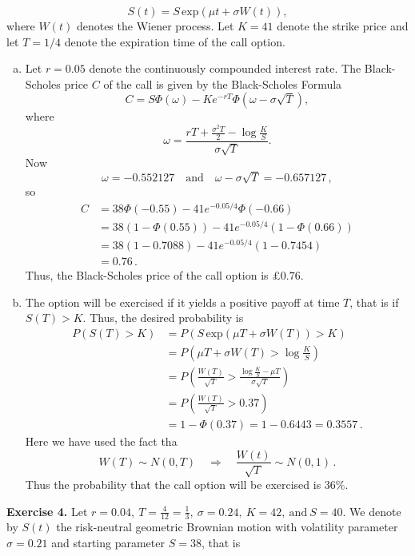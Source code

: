 \documentclass[11pt,a4paper]{article}
\begin{document}
    $$
    S(t) = S\, \text{exp}(\mu t +\sigma W(t)),
    $$
    where $W(t)$ denotes the Wiener process. Let $K = 41$ denote the strike price and let $T = 1/4$ denote the expiration time of the call option.
    \begin{enumerate}[(a)]
        \item Let $r = 0.05$ denote the continuously compounded interest rate. The Black-Scholes price $C$ of the call is given by the Black-Scholes Formula
        $$
        C = S \Phi (\omega)-Ke^{-rT}\Phi(\omega - \sigma \sqrt{T}),
        $$
        where
        $$
        \omega = \frac{rT+\frac{\sigma^2T}{2}-\log \frac{K}{S}}{\sigma\sqrt{T}}.
        $$
        Now
        $$
        \omega = −0.552127\quad \text{and}\quad \omega − \sigma \sqrt{T} = −0.657127\, ,
        $$
        so
        \begin{align*}
            C
            &= 38\Phi(-0.55)-41e^{-0.05/4}\Phi(-0.66)\\
            &= 38(1-\Phi(0.55))-41e^{-0.05/4}(1-\Phi (0.66))\\
            &= 38(1-0.7088)-41e^{-0.05/4}(1-0.7454)\\
            &= 0.76\, .
        \end{align*}
        Thus, the Black-Scholes price of the call option is $\pounds 0.76$.
        \item The option will be exercised if it yields a positive payoff at time $T$, that is if $S(T) > K$. Thus, the desired probability is
        \begin{align*}
            P(S(T) > K)
            &= P(S\, \text{exp}(\mu T + \sigma W(T)) > K)\\
            &= P\left(\mu T + \sigma W(T)> \log\frac{K}{S}\right)\\
            &= P\left(\frac{W(T)}{\sqrt{T}}>\frac{\log\frac{K}{S}-\mu T}{\sigma \sqrt{T}}\right)\\
            &= P\left(\frac{W(T)}{\sqrt{T}}>0.37\right)\\
            &= 1-\Phi(0.37) = 1-0.6443 = 0.3557\, .
        \end{align*}
        Here we have used the fact tha
        $$
        W(T)\sim N(0,T) \quad \Rightarrow \quad \frac{W(t)}{\sqrt{T}}\sim N(0,1)\, .
        $$
        Thus the probability that the call option will be exercised is $36\%$.
    \end{enumerate}
    \textbf{Exercise 4.} Let $r = 0.04,\ T = \frac{4}{12} = \frac{1}{3},\ \sigma = 0.24,\ K = 42,\ \text{and}\ S = 40$. We denote by $S(t)$ the risk-neutral geometric Brownian motion with volatility parameter $\sigma = 0.21$ and starting parameter $S = 38$, that is
\end{document}
